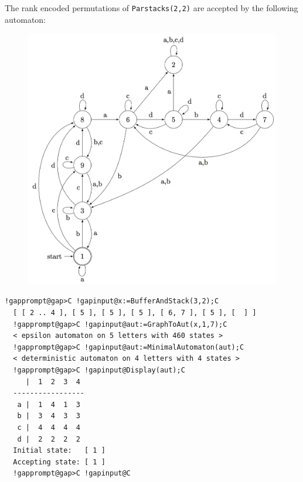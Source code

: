 \documentclass[a4paper,11pt]{report}
\begin{document}
{{{      The rank encoded permutations of \texttt{Parstacks(2,2)} are accepted by the following automaton:
      \begin{figure}[H] \begin{center} \leavevmode \includegraphics[scale=0.75]{img/ps22aut.jpg} \end{center} \end{figure}
      
\begin{Verbatim}[commandchars=!@C,fontsize=\small,frame=single,label=Example]
  !gapprompt@gap>C !gapinput@x:=BufferAndStack(3,2);C
  [ [ 2 .. 4 ], [ 5 ], [ 5 ], [ 5 ], [ 6, 7 ], [ 5 ], [  ] ]
  !gapprompt@gap>C !gapinput@aut:=GraphToAut(x,1,7);C
  < epsilon automaton on 5 letters with 460 states >
  !gapprompt@gap>C !gapinput@aut:=MinimalAutomaton(aut);C
  < deterministic automaton on 4 letters with 4 states >
  !gapprompt@gap>C !gapinput@Display(aut);C
     |  1  2  3  4  
  -----------------
   a |  1  4  1  3  
   b |  3  4  3  3  
   c |  4  4  4  4  
   d |  2  2  2  2  
  Initial state:   [ 1 ]
  Accepting state: [ 1 ]
  !gapprompt@gap>C !gapinput@C
\end{Verbatim}
 
}}}
\end{document}
